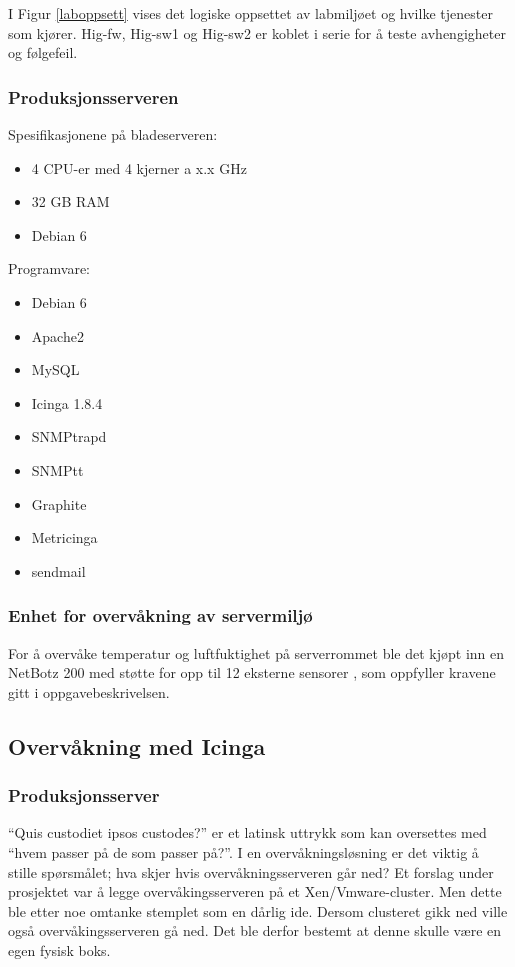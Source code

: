 I Figur \ref{laboppsett} vises det logiske oppsettet av labmiljøet og hvilke tjenester som kjører. Hig-fw, Hig-sw1 og Hig-sw2 er koblet i serie for å teste avhengigheter og følgefeil.

\subsubsection{Produksjonsserveren}
Spesifikasjonene på bladeserveren:
\begin{itemize}
\item 4 CPU-er med 4 kjerner a x.x GHz
\item 32 GB RAM
\item Debian 6
\end{itemize}
Programvare:
\begin{itemize}
\item Debian 6
\item Apache2
\item MySQL
\item Icinga 1.8.4
\item SNMPtrapd
\item SNMPtt
\item Graphite
\item Metricinga 
\item sendmail
\end{itemize}
\subsubsection{Enhet for overvåkning av servermiljø}
For å overvåke temperatur og luftfuktighet på serverrommet ble det kjøpt inn en NetBotz 200 med støtte for opp til 12 eksterne sensorer \cite{netbotz},
som oppfyller kravene gitt i oppgavebeskrivelsen. 

\subsection{Overvåkning med Icinga}
\subsubsection{Produksjonsserver}
“Quis custodiet ipsos custodes?” er et latinsk uttrykk som kan oversettes med “hvem passer på de som passer på?”. I en overvåkningsløsning er det viktig å stille spørsmålet; hva skjer hvis overvåkningsserveren går ned? Et forslag under prosjektet var å legge overvåkingsserveren på et Xen/Vmware-cluster. Men dette ble etter noe omtanke stemplet som en dårlig ide. Dersom clusteret gikk ned ville også overvåkingsserveren gå ned. Det ble derfor bestemt at denne skulle være en egen fysisk boks. 


